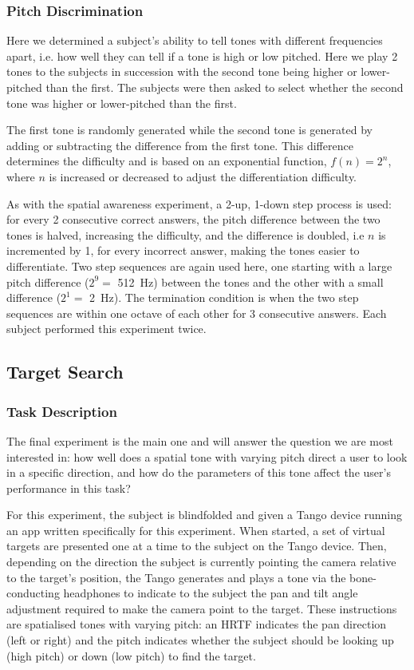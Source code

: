 \documentclass[format=sigconf, review=true, screen=true, anonymous=true]{acmart}
\begin{document}
\subsubsection{Pitch Discrimination}

Here we determined a subject's ability to tell tones with different frequencies apart, i.e. how well they can tell if a tone is high or low pitched. Here we play 2 tones to the subjects in succession with the second tone being higher or lower-pitched than the first. The subjects were then asked to select whether the second tone was higher or lower-pitched than the first.

The first tone is randomly generated while the second tone is generated by adding or subtracting the difference from the first tone. This difference determines the difficulty and is based on an exponential function, $f(n) = 2^n$, where $n$ is increased or decreased to adjust the differentiation difficulty. 

As with the spatial awareness experiment, a 2-up, 1-down step process is used: for every 2 consecutive correct answers, the pitch difference between the two tones is halved, increasing the difficulty, and the difference is doubled, i.e $n$ is incremented by 1, for every incorrect answer, making the tones easier to differentiate. Two step sequences are again used here, one starting with a large pitch difference ($2^9=$ \SI{512}{\hertz}) between the tones and the other with a small difference ($2^1=$ \SI{2}{\hertz}). The termination condition is when the two step sequences are within one octave of each other for 3 consecutive answers. Each subject performed this experiment twice. 

\subsection{Target Search}

\subsubsection{Task Description}

The final experiment is the main one and will answer the question we are most interested in: how well does a spatial tone with varying pitch direct a user to look in a specific direction, and how do the parameters of this tone affect the user's performance in this task? 

For this experiment, the subject is blindfolded and given a Tango device running an app written specifically for this experiment. When started, a set of virtual targets are presented one at a time to the subject on the Tango device. Then, depending on the direction the subject is currently pointing the camera relative to the target's position, the Tango generates and plays a tone via the bone-conducting headphones to indicate to the subject the pan and tilt angle adjustment required to make the camera point to the target. These instructions are spatialised tones with varying pitch: an HRTF indicates the pan direction (left or right) and the pitch indicates whether the subject should be looking up (high pitch) or down (low pitch) to find the target. 
\end{document}
